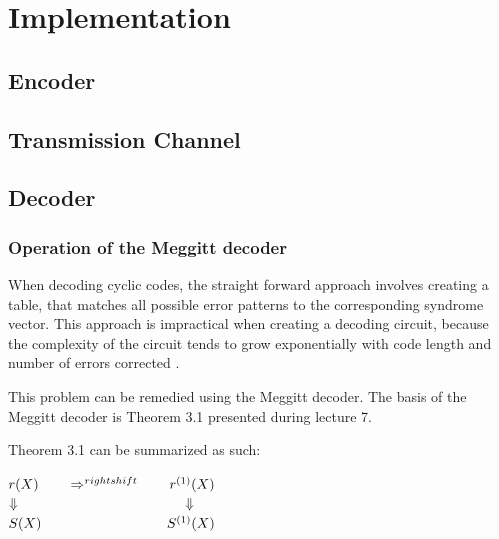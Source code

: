 \documentclass[Main]{subfiles}
\begin{document}
\chapter{Implementation}

\section{Encoder}

\section{Transmission Channel}

\section{Decoder}

\subsection{Operation of the Meggitt decoder}

When decoding cyclic codes, the straight forward approach involves creating a table, that matches all possible error patterns to the corresponding syndrome vector. This approach is impractical when creating a decoding circuit, because the complexity of the circuit tends to grow exponentially with code length and number of errors corrected \cite{lec7}.

This problem can be remedied using the Meggitt decoder. The basis of the Meggitt decoder is Theorem 3.1 presented during lecture 7\cite{lec7}.

\noindent
{}

Theorem 3.1 can be summarized as such:

$ r(X) \hspace*{2em}  \Rightarrow^{rightshift} \hspace*{2em} r^{(1)}(X)$ \\
$ \Downarrow \hspace*{12em} \Downarrow$ \\
$ S(X) \hspace*{9em} S^{(1)}(X)$ \\
\end{document}
